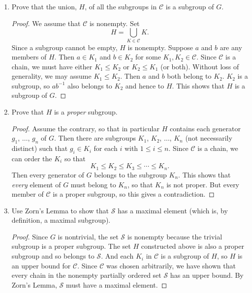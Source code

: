 \begin{enumerate}
\item Prove that the union, $H$, of all the subgroups in $\mathcal{C}$
  is a subgroup of $G$.
  \begin{proof}
    We assume that $\mathcal{C}$ is nonempty. Set
    \begin{equation*}
      H = \bigcup_{K\in\mathcal{C}}K.
    \end{equation*}
    Since a subgroup cannot be empty, $H$ is nonempty. Suppose $a$ and
    $b$ are any members of $H$. Then $a\in K_1$ and $b\in K_2$ for
    some $K_1,K_2\in\mathcal{C}$. Since $\mathcal{C}$ is a chain, we
    must have either $K_1\leq K_2$ or $K_2\leq K_1$ (or both). Without
    loss of generality, we may assume $K_1\leq K_2$. Then $a$ and $b$
    both belong to $K_2$. $K_2$ is a subgroup, so $ab^{-1}$ also
    belongs to $K_2$ and hence to $H$. This shows that $H$ is a
    subgroup of $G$.
  \end{proof}
\item Prove that $H$ is a {\em proper} subgroup.
  \begin{proof}
    Assume the contrary, so that in particular $H$ contains each
    generator $g_1$, $\dots$, $g_n$ of $G$. Then there are subgroups
    $K_1$, $K_2$, $\dots$, $K_n$ (not necessarily distinct) such that
    $g_i\in K_i$ for each $i$ with $1\leq i\leq n$. Since
    $\mathcal{C}$ is a chain, we can order the $K_i$ so that
    \begin{equation*}
      K_1\leq K_2\leq K_3\leq\cdots\leq K_n.
    \end{equation*}
    Then every generator of $G$ belongs to the subgroup $K_n$. This
    shows that {\em every} element of $G$ must belong to $K_n$, so
    that $K_n$ is not proper. But every member of $\mathcal{C}$ is a
    proper subgroup, so this gives a contradiction.
  \end{proof}
\item Use Zorn's Lemma to show that $\mathcal{S}$ has a maximal
  element (which is, by definition, a maximal subgroup).
  \begin{proof}
    Since $G$ is nontrivial, the set $\mathcal{S}$ is nonempty because
    the trivial subgroup is a proper subgroup. The set $H$ constructed
    above is also a proper subgroup and so belongs to
    $\mathcal{S}$. And each $K_i$ in $\mathcal{C}$ is a subgroup of
    $H$, so $H$ is an upper bound for $\mathcal{C}$. Since
    $\mathcal{C}$ was chosen arbitrarily, we have shown that every
    chain in the nonempty partially ordered set $\mathcal{S}$ has an
    upper bound. By Zorn's Lemma, $\mathcal{S}$ must have a maximal
    element.
  \end{proof}
\end{enumerate}

